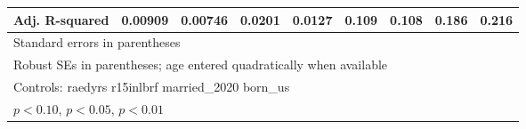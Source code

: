 \begin{table}[htbp]
\begin{tabular}{l*{8}{c}}
Adj. R-squared  &  0.00909         &  0.00746         &   0.0201         &   0.0127         &    0.109         &    0.108         &    0.186         &    0.216         \\
\bottomrule
\multicolumn{9}{l}{\footnotesize Standard errors in parentheses}\\
\multicolumn{9}{l}{\footnotesize Robust SEs in parentheses; age entered quadratically when available}\\
\multicolumn{9}{l}{\footnotesize Controls:  raedyrs r15inlbrf married\_2020 born\_us}\\
\multicolumn{9}{l}{\footnotesize \sym{*} \(p<0.10\), \sym{**} \(p<0.05\), \sym{***} \(p<0.01\)}\\
\end{tabular}
\end{table}
